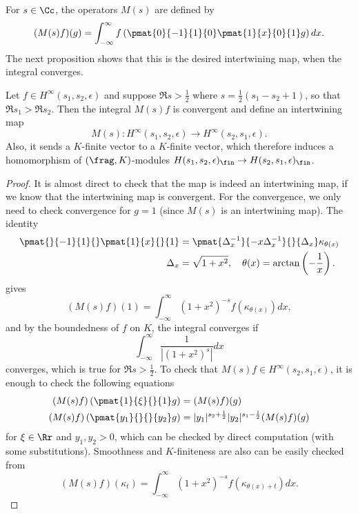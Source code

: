 For $s\in \Cc$, the operators $M(s)$ are defined by 
$$
(M(s)f)(g) = \int_{-\infty}^{\infty} f\left(\pmat{0}{-1}{1}{0}\pmat{1}{x}{0}{1}g\right)dx.
$$
The next proposition shows that this is the desired intertwining map, when the integral converges. 
\begin{proposition}
Let $f\in H^{\infty}(s_{1}, s_{2}, \epsilon)$ and suppose $\Re s >\frac{1}{2}$ where $s = \frac{1}{2}(s_{1} - s_{2} + 1)$, so that $\Re s_{1} > \Re s_{2}$. Then the integral $M(s)f$ is convergent and define an intertwining map 
$$
M(s):H^{\infty}(s_{1}, s_{2}, \epsilon) \to H^{\infty}(s_{2}, s_{1}, \epsilon).
$$
Also, it sends a $K$-finite vector to a $K$-finite vector, which therefore induces a homomorphism of $(\frag, K)$-modules $H(s_{1}, s_{2}, \epsilon)_{\fin} \to H(s_{2}, s_{1}, \epsilon)_{\fin}$. 
\end{proposition}
\begin{proof}
It is almost direct to check that the map is indeed an intertwining map, if we know that the intertwining map is convergent. 
For the convergence, we only need to check convergence for $g = 1$ (since $M(s)$ is an intertwining map). The identity  
\begin{align*}
\pmat{}{-1}{1}{}\pmat{1}{x}{}{1} &= \pmat{\Delta_{x}^{-1}}{-x\Delta_{x}^{-1}}{}{\Delta_{x}} \kappa_{\theta(x)} \\
\Delta_{x} &= \sqrt{1+x^{2}}, \quad \theta(x) = \arctan\left(-\frac{1}{x}\right). 
\end{align*}
gives
$$
(M(s)f)(1) = \int_{-\infty}^{\infty} (1+x^{2})^{-s}f(\kappa_{\theta(x)})dx, 
$$
and by the boundedness of $f$ on $K$, the integral converges if 
$$
\int_{-\infty}^{\infty} \frac{1}{|(1+x^{2})^{s}|} dx
$$
converges, which is true for $\Re s>\frac{1}{2}$. 
To check that $M(s)f\in H^{\infty}(s_{2}, s_{1}, \epsilon)$, it is enough to check the following equations
\begin{align*}
(M(s)f)\left(\pmat{1}{\xi}{}{1}g\right) &= (M(s)f)(g) \\
(M(s)f)\left(\pmat{y_{1}}{}{}{y_{2}}g\right) &= |y_{1}|^{s_{2} + \frac{1}{2}} |y_{2}|^{s_{1} - \frac{1}{2}} (M(s)f)(g)
\end{align*}
for $\xi\in \Rr$ and $y_{1}, y_{2}>0$, which can be checked by direct computation (with some substitutions). 
Smoothness and $K$-finiteness are also can be easily checked from
$$
(M(s)f)(\kappa_{t}) = \int_{-\infty}^{\infty} (1+x^{2})^{-s}f(\kappa_{\theta(x)+t})dx.
$$
\end{proof}

